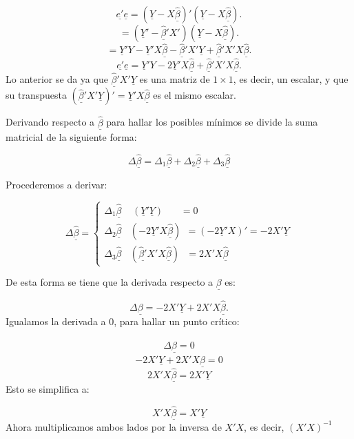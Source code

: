 \documentclass[
  a4paper,
  oneside,
  openany]{book}
\begin{document}
\[\underline{e'}\underline{e}=\left( \underline{Y}-X \underline{\hat{\beta}}\right)'\left( \underline{Y}-X \underline{\hat{\beta}}\right).\]
\[=\left(\underline{Y}'- \underline{\hat{\beta}}'X'\right)\left( \underline{Y}-X \underline{\hat{\beta}}\right).\]
\[=\underline{Y}'Y-\underline{Y}'X\underline{\hat{\beta}}-\underline{\hat{\beta}}'X'\underline{Y}+\underline{\hat{\beta}}'X'X\underline{\hat{\beta}}.\]
\[\underline{e'}\underline{e}=\underline{Y}'Y-2\underline{Y}'X\underline{\hat{\beta}}+\underline{\hat{\beta}}'X'X\underline{\hat{\beta}}.\]
Lo anterior se da ya que \(\underline{\hat{\beta}}'X'\underline{Y}\) es una matriz de \(1\times 1\), es decir, un escalar, y que su transpuesta \((\underline{\hat{\beta}}'X'\underline{Y})'=\underline{Y}'X\underline{\hat{\beta}}\) es el mismo escalar.

Derivando respecto a \(\underline{\hat{\beta}}\) para hallar los posibles mínimos se divide la suma matricial de la siguiente forma:

\[\Delta \underline{\hat\beta}=\Delta_{1} \underline{\hat{\beta}}+\Delta_{2} \underline{\hat{\beta}}+\Delta_{3} \underline{\hat{\beta}}\]

Procederemos a derivar:

\[
\Delta\underline{\hat{\beta}}=\left\{
\begin{array}{ll}
\Delta_{1} \underline{\hat{\beta}} \ \ \ \ \ \left(\underline{Y}'\underline{Y}\right)  \ \ \ \ \ \ \ \ =0 \\
\Delta_{2} \underline{\hat{\beta}} \ \ \ \ \left( -2\underline{Y}'X\underline{\hat{\beta}}\right) \ \ = \left(-2\underline{Y}'X\right)'=-2X'\underline{Y} \\
\Delta_{3} \underline{\hat{\beta}} \ \  \ \ \left( \underline{\hat{\beta}'}X'X\underline{\hat{\beta}}\right)  \ \ \ = 2X'X\underline{\hat{\beta}}
\end{array}
\right. 
\]

De esta forma se tiene que la derivada respecto a \(\underline{\beta}\) es:

\[\Delta \underline{\beta}=-2X'\underline{Y}+2X'X\underline{\hat{\beta}}.\]
Igualamos la derivada a 0, para hallar un punto crítico:

\[\Delta \underline{\hat{\beta}}=0\]
\[-2X'\underline{Y}+2X'X\underline{\hat{\beta}}=0\]
\[2X'X\underline{\hat{\beta}}=2X'\underline{Y}\]
Esto se simplifica a:

\[X'X\underline{\hat{\beta}}=X'\underline{Y}\]
Ahora multiplicamos ambos lados por la inversa de \(X'X\), es decir, \((X'X)^{-1}\)
\end{document}

